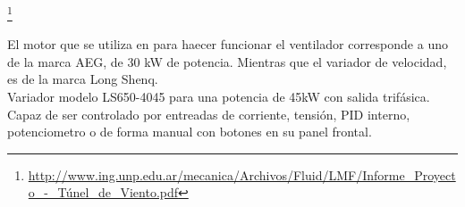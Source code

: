 			\footnote{\url{http://www.ing.unp.edu.ar/mecanica/Archivos/Fluid/LMF/Informe_Proyecto_-_Túnel_de_Viento.pdf}}
	\begin{minipage}[t]{.5\textwidth}
		
El motor que se utiliza en para haecer funcionar el ventilador corresponde a uno de la marca AEG, de 30 kW de potencia. Mientras que el variador de velocidad, es de la marca Long Shenq. \\
Variador modelo LS650-4045 para una potencia de 45kW con salida trifásica. Capaz de ser controlado por entreadas de corriente, tensión, PID interno, potenciometro o de forma manual con botones en su panel frontal.
	\end{minipage}	
	\begin{minipage}[t]{.5\textwidth}
		\centering{}
		\label{fig:LS650}
	\end{minipage}

		
		\newpage